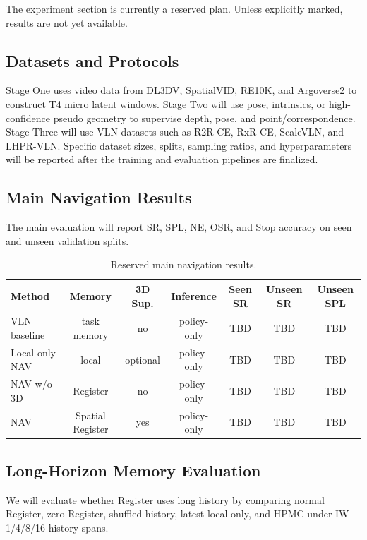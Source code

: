 \documentclass[11pt,a4paper]{ctexart}
\begin{document}
The experiment section is currently a reserved plan. Unless explicitly marked, results are not yet available.

\subsection{Datasets and Protocols}

Stage One uses video data from DL3DV, SpatialVID, RE10K, and Argoverse2 to construct T4 micro latent windows. Stage Two will use pose, intrinsics, or high-confidence pseudo geometry to supervise depth, pose, and point/correspondence. Stage Three will use VLN datasets such as R2R-CE, RxR-CE, ScaleVLN, and LHPR-VLN. Specific dataset sizes, splits, sampling ratios, and hyperparameters will be reported after the training and evaluation pipelines are finalized.

\subsection{Main Navigation Results}

The main evaluation will report SR, SPL, NE, OSR, and Stop accuracy on seen and unseen validation splits.

\begin{table}[h]
\centering
\small
\begin{tabular}{lcccccc}
\toprule
Method & Memory & 3D Sup. & Inference & Seen SR & Unseen SR & Unseen SPL \\
\midrule
VLN baseline & task memory & no & policy-only & TBD & TBD & TBD \\
Local-only NAV & local & optional & policy-only & TBD & TBD & TBD \\
NAV w/o 3D & Register & no & policy-only & TBD & TBD & TBD \\
NAV & Spatial Register & yes & policy-only & TBD & TBD & TBD \\
\bottomrule
\end{tabular}
\caption{Reserved main navigation results.}
\end{table}

\subsection{Long-Horizon Memory Evaluation}

We will evaluate whether Register uses long history by comparing normal Register, zero Register, shuffled history, latest-local-only, and HPMC under IW-1/4/8/16 history spans.
\end{document}
